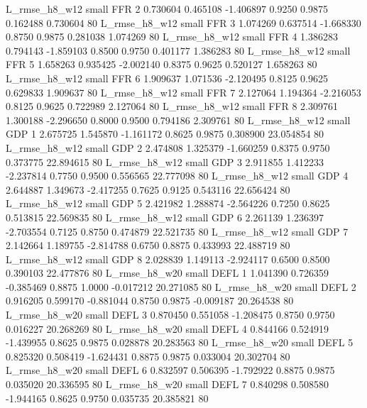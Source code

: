 L_rmse_h8_w12      small      FFR                 2 0.730604 0.465108 -1.406897 0.9250 0.9875  0.162488    0.730604 80
 L_rmse_h8_w12      small      FFR                 3 1.074269 0.637514 -1.668330 0.8750 0.9875  0.281038    1.074269 80
 L_rmse_h8_w12      small      FFR                 4 1.386283 0.794143 -1.859103 0.8500 0.9750  0.401177    1.386283 80
 L_rmse_h8_w12      small      FFR                 5 1.658263 0.935425 -2.002140 0.8375 0.9625  0.520127    1.658263 80
 L_rmse_h8_w12      small      FFR                 6 1.909637 1.071536 -2.120495 0.8125 0.9625  0.629833    1.909637 80
 L_rmse_h8_w12      small      FFR                 7 2.127064 1.194364 -2.216053 0.8125 0.9625  0.722989    2.127064 80
 L_rmse_h8_w12      small      FFR                 8 2.309761 1.300188 -2.296650 0.8000 0.9500  0.794186    2.309761 80
 L_rmse_h8_w12      small      GDP                 1 2.675725 1.545870 -1.161172 0.8625 0.9875  0.308900   23.054854 80
 L_rmse_h8_w12      small      GDP                 2 2.474808 1.325379 -1.660259 0.8375 0.9750  0.373775   22.894615 80
 L_rmse_h8_w12      small      GDP                 3 2.911855 1.412233 -2.237814 0.7750 0.9500  0.556565   22.777098 80
 L_rmse_h8_w12      small      GDP                 4 2.644887 1.349673 -2.417255 0.7625 0.9125  0.543116   22.656424 80
 L_rmse_h8_w12      small      GDP                 5 2.421982 1.288874 -2.564226 0.7250 0.8625  0.513815   22.569835 80
 L_rmse_h8_w12      small      GDP                 6 2.261139 1.236397 -2.703554 0.7125 0.8750  0.474879   22.521735 80
 L_rmse_h8_w12      small      GDP                 7 2.142664 1.189755 -2.814788 0.6750 0.8875  0.433993   22.488719 80
 L_rmse_h8_w12      small      GDP                 8 2.028839 1.149113 -2.924117 0.6500 0.8500  0.390103   22.477876 80
 L_rmse_h8_w20      small     DEFL                 1 1.041390 0.726359 -0.385469 0.8875 1.0000 -0.017212   20.271085 80
 L_rmse_h8_w20      small     DEFL                 2 0.916205 0.599170 -0.881044 0.8750 0.9875 -0.009187   20.264538 80
 L_rmse_h8_w20      small     DEFL                 3 0.870450 0.551058 -1.208475 0.8750 0.9750  0.016227   20.268269 80
 L_rmse_h8_w20      small     DEFL                 4 0.844166 0.524919 -1.439955 0.8625 0.9875  0.028878   20.283563 80
 L_rmse_h8_w20      small     DEFL                 5 0.825320 0.508419 -1.624431 0.8875 0.9875  0.033004   20.302704 80
 L_rmse_h8_w20      small     DEFL                 6 0.832597 0.506395 -1.792922 0.8875 0.9875  0.035020   20.336595 80
 L_rmse_h8_w20      small     DEFL                 7 0.840298 0.508580 -1.944165 0.8625 0.9750  0.035735   20.385821 80
